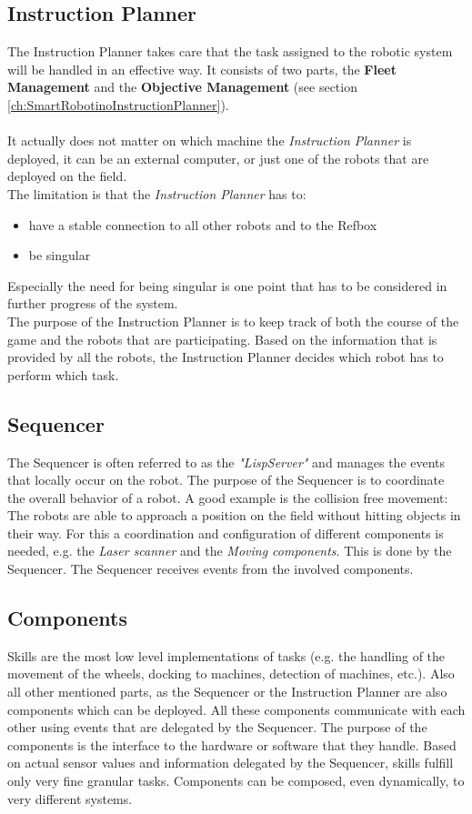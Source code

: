 \subsection{Instruction Planner}
The Instruction Planner takes care that the task assigned to the robotic system will be handled in an effective way. It consists of two parts, the \textbf{Fleet Management} and the \textbf{Objective Management} (see section \ref{ch:SmartRobotinoInstructionPlanner}). \\
\\
It actually does not matter on which machine the \textit{Instruction Planner} is deployed, it can be an external computer, or just one of the robots that are deployed on the field.\\
The limitation is that the \textit{Instruction Planner} has to:
\begin{itemize}
    \item have a stable connection to all other robots and to the Refbox
    \item be singular
\end{itemize}
Especially the need for being singular is one point that has to be considered in further progress of the system.
\\
The purpose of the Instruction Planner is to keep track of both the course of the game and the robots that are participating.
Based on the information that is provided by all the robots, the Instruction Planner decides which robot has to perform which task.

\subsection{Sequencer}
The Sequencer is often referred to as the \textit{"LispServer"} and manages the events that locally occur on the robot. The purpose of the Sequencer is to coordinate the overall behavior 
of a robot. 
A good example is the collision free movement: The robots are able to approach a position on the field without hitting objects in their way. For this a coordination and configuration of different components is needed, 
e.g. the \textit{Laser scanner} and the \textit{Moving components}. This is done by the Sequencer. The Sequencer receives events from the involved components. 

\subsection{Components}
Skills are the most low level implementations of tasks (e.g. the handling of the movement of the wheels, docking to machines, detection of machines, etc.).
Also all other mentioned parts, as the Sequencer or the Instruction Planner are also components which can be deployed.
All these components communicate with each other using events that are delegated by the Sequencer.
The purpose of the components is the interface to the hardware or software that they handle.
Based on actual sensor values and information delegated by the Sequencer, skills fulfill only very fine granular tasks. Components can be composed, even dynamically, to very different systems.

